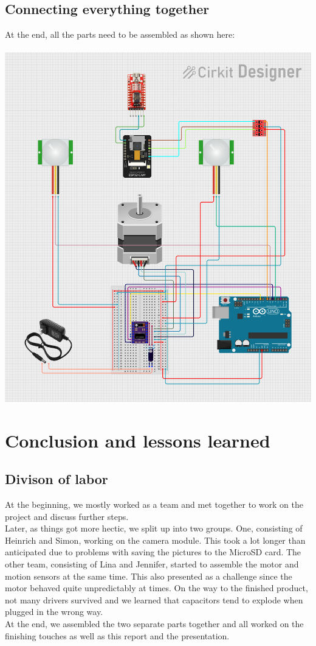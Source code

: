\documentclass{article}
\begin{document}
\subsection{Connecting everything together} 
At the end, all the parts need to be assembled as shown here:\\
\\
\includegraphics[width=\textwidth]{circuit_image(1).png}

\newpage
\section{Conclusion and lessons learned}
\subsection{Divison of labor}
At the beginning, we mostly worked as a team and met together to work on the project and discuss further steps.\\
Later, as things got more hectic, we split up into two groups. One, consisting of Heinrich and Simon, working on the camera module. This took a lot longer than anticipated due to problems with saving the pictures to the MicroSD card. The other team, consisting of Lina and Jennifer, started to assemble the motor and motion sensors at the same time. This also presented as a challenge since the motor behaved quite unpredictably at times. On the way to the finished product, not many drivers survived and we learned that capacitors tend to explode when plugged in the wrong way.\\
At the end, we assembled the two separate parts together and all worked on the finishing touches as well as this report and the presentation.
\end{document}
